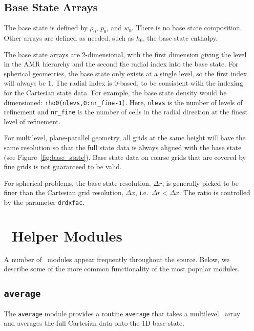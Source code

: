 \subsection{Base State Arrays}

The base state is defined by $\rho_0$, $p_0$, and $w_0$.  There is no
base state composition.  Other arrays are defined as needed, such as
$h_0$, the base state enthalpy.

The base state arrays are 2-dimensional, with the first dimension
giving the level in the AMR hierarchy and the second the radial index
into the base state.  For spherical geometries, the base state only
exists at a single level, so the first index will always be 1.  The
radial index is 0-based, to be consistent with the indexing for the
Cartesian state data.  For example, the base state density would be
dimensioned: {\tt rho0(nlevs,0:nr\_fine-1)}.  Here, {\tt nlevs} is the
number of levels of refinement and {\tt nr\_fine} is the number of
cells in the radial direction at the finest level of refinement.

For multilevel, plane-parallel geometry, all grids at the same height
will have the same resolution so that the full state data is always
aligned with the base state (see Figure~\ref{fig:base_state}).  Base
state data on coarse grids that are covered by fine grids is not
guaranteed to be valid.

For spherical problems, the base state resolution, $\Delta r$, is
generally picked to be finer than the Cartesian grid resolution,
$\Delta x$, i.e.\ $\Delta r < \Delta x$.  The ratio is controlled
by the parameter {\tt drdxfac}.



\section{\maestro\ Helper Modules}

A number of \maestro\ modules appear frequently throughout the source.
Below, we describe some of the more common functionality of the most
popular modules.

\subsection{\tt average}

The {\tt average} module provides a routine {\tt average} that takes
a multilevel \multifab\ array and averages the full Cartesian data
onto the 1D base state.

